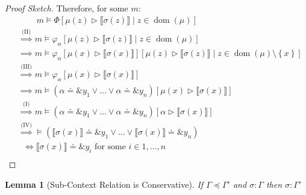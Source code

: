 \documentclass[twoside, english, final]{sdqthesis}
\newcommand{\set}[1]{\left\{ #1 \right\}}
\newcommand{\bbracket}[1]{\llbracket #1 \rrbracket}
\newcommand{\tr}[0]{\triangleright}
\DeclareMathOperator{\dom}{dom}
\newtheorem{lemma}[theorem]{Lemma}
\theoremstyle{definition}
\begin{document}
\begin{proof}[Proof Sketch]
  Therefore, for some $m$:
  \begin{align*}
    &\phantom{\implies}\ m \vDash \Phi[\mu(z) \tr \bbracket{\sigma(z)} \mid z \in \dom(\mu)] \\
    &\overset{\text{(II)}}{\implies} m \vDash \varphi_\alpha[\mu(z) \tr \bbracket{\sigma(z)} \mid z \in \dom(\mu)] \\
    &\overset{\text{}}{\implies} m \vDash \varphi_\alpha[\mu(x) \tr \bbracket{\sigma(x)}][\mu(z) \tr \bbracket{\sigma(z)} \mid z \in \dom(\mu) \setminus \set{x}] \\
    &\overset{\text{(III)}}{\implies} m \vDash \varphi_\alpha[\mu(x) \tr \bbracket{\sigma(x)}] \\
    &\overset{\text{}}{\implies} m \vDash (\alpha \doteq \&y_1 \vee \dots \vee \alpha \doteq \&y_n)[\mu(x) \tr \bbracket{\sigma(x)}] \\
    &\overset{\text{(I)}}{\implies} m \vDash (\alpha \doteq \&y_1 \vee \dots \vee \alpha \doteq \&y_n)[\alpha \tr \bbracket{\sigma(x)}] \\
    &\overset{\text{(IV)}}{\implies} \vDash (\bbracket{\sigma(x)} \doteq \&y_1 \vee \dots \vee \bbracket{\sigma(x)} \doteq \&y_n) \\
    &\ \ \,\overset{\text{}}{\Leftrightarrow} \bbracket{\sigma(x)} \doteq \&y_i \text{ for some $i \in 1,\dots,n$} \\
  \end{align*}
\end{proof}

\begin{lemma}[Sub-Context Relation is Conservative]\label{lem:conservative-subtype}
  If \hyperref[rule:Sub-Ctx]{$\Gamma \preceq \Gamma'$} and $\sigma : \Gamma$ then $\sigma : \Gamma'$
\end{lemma}
\end{document}
